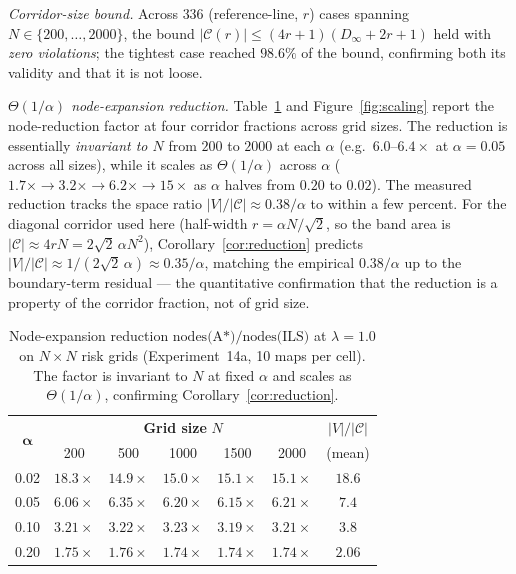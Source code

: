\documentclass[preprint,12pt,authoryear]{elsarticle}
\begin{document}
\emph{Corridor-size bound.} Across $336$ (reference-line, $r$) cases spanning $N \in \{200,\dots,2000\}$, the bound $|\mathcal{C}(r)| \leq (4r+1)(D_\infty+2r+1)$ held with \emph{zero violations}; the tightest case reached $98.6\%$ of the bound, confirming both its validity and that it is not loose.

\emph{$\Theta(1/\alpha)$ node-expansion reduction.} Table~\ref{tab:exp14_scaling} and Figure~\ref{fig:scaling} report the node-reduction factor at four corridor fractions across grid sizes. The reduction is essentially \emph{invariant to $N$} from $200$ to $2000$ at each $\alpha$ (e.g.\ $6.0$--$6.4\times$ at $\alpha=0.05$ across all sizes), while it scales as $\Theta(1/\alpha)$ across $\alpha$ ($1.7\times \to 3.2\times \to 6.2\times \to 15\times$ as $\alpha$ halves from $0.20$ to $0.02$). The measured reduction tracks the space ratio $|V|/|\mathcal{C}| \approx 0.38/\alpha$ to within a few percent. For the diagonal corridor used here (half-width $r = \alpha N/\sqrt{2}$, so the band area is $|\mathcal{C}| \approx 4rN = 2\sqrt{2}\,\alpha N^2$), Corollary~\ref{cor:reduction} predicts $|V|/|\mathcal{C}| \approx 1/(2\sqrt{2}\,\alpha) \approx 0.35/\alpha$, matching the empirical $0.38/\alpha$ up to the boundary-term residual --- the quantitative confirmation that the reduction is a property of the corridor fraction, not of grid size.

\begin{table}[!htbp]
\centering
\caption{Node-expansion reduction $\text{nodes(A*)}/\text{nodes(ILS)}$ at $\lambda = 1.0$ on $N \times N$ risk grids (Experiment~14a, 10 maps per cell). The factor is invariant to $N$ at fixed $\alpha$ and scales as $\Theta(1/\alpha)$, confirming Corollary~\ref{cor:reduction}.}
\label{tab:exp14_scaling}
\begin{tabular}{ccccccc}
\toprule
\multirow{2}{*}{$\boldsymbol{\alpha}$} & \multicolumn{5}{c}{\textbf{Grid size } $N$} & \textbf{$|V|/|\mathcal{C}|$} \\
 & 200 & 500 & 1000 & 1500 & 2000 & (mean) \\
\midrule
0.02 & $18.3\times$ & $14.9\times$ & $15.0\times$ & $15.1\times$ & $15.1\times$ & $18.6$ \\
0.05 & $6.06\times$ & $6.35\times$ & $6.20\times$ & $6.15\times$ & $6.21\times$ & $7.4$ \\
0.10 & $3.21\times$ & $3.22\times$ & $3.23\times$ & $3.19\times$ & $3.21\times$ & $3.8$ \\
0.20 & $1.75\times$ & $1.76\times$ & $1.74\times$ & $1.74\times$ & $1.74\times$ & $2.06$ \\
\bottomrule
\end{tabular}
\end{table}
\end{document}
